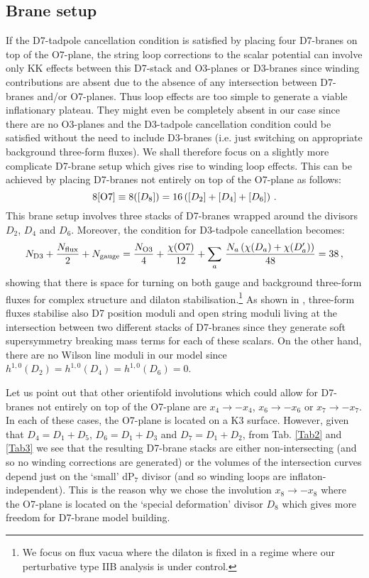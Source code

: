 \documentclass[11pt,a4paper]{article}
\newcommand{\be}{\begin{equation}}
\newcommand{\ee}{\end{equation}}
\def\nn{\nonumber}
\begin{document}
\subsection{Brane setup}

If the D7-tadpole cancellation condition is satisfied by placing four D7-branes on top of the O7-plane, the string loop corrections to the scalar potential can involve only KK effects between this D7-stack and O3-planes or D3-branes since winding contributions are absent due to the absence of any intersection between D7-branes and/or O7-planes. Thus loop effects are too simple to generate a viable inflationary plateau. They might even be completely absent in our case since there are no O3-planes and the D3-tadpole cancellation condition could be satisfied without the need to include D3-branes (i.e. just switching on appropriate background three-form fluxes). We shall therefore focus on a slightly more complicate D7-brane setup which gives rise to winding loop effects. This can be achieved by placing D7-branes not entirely on top of the O7-plane as follows:  
\be
8[{\rm O7}] \equiv 8([D_8]) = 16 \left([D_2]+[D_4]+[D_6] \right)\,.
\ee
This brane setup involves three stacks of D7-branes wrapped around the divisors $D_2$, $D_4$ and $D_6$. Moreover, the condition for D3-tadpole cancellation becomes:
\be
N_{\rm D3} + \frac{N_{\rm flux}}{2} + N_{\rm gauge} = \frac{N_{\rm O3}}{4} + \frac{\chi({\rm O7})}{12} + \sum_a\, \frac{N_a \left(\chi(D_a) + \chi(D_a^\prime) \right) }{48}  = 38 \,, \nn
\ee
showing that there is space for turning on both gauge and background three-form fluxes for complex structure and dilaton stabilisation.\footnote{We focus on flux vacua where the dilaton is fixed in a regime where our perturbative type IIB analysis is under control.} As shown in \cite{Camara:2004jj}, three-form fluxes stabilise also D7 position moduli and open string moduli living at the intersection between two different stacks of D7-branes since they generate soft supersymmetry breaking mass terms for each of these scalars. On the other hand, there are no Wilson line moduli in our model since $h^{1,0}(D_2)=h^{1,0}(D_4) = h^{1,0}(D_6)=0$. 

Let us point out that other orientifold involutions which could allow for D7-branes not entirely on top of the O7-plane are $x_4 \to - x_4$, $x_6 \to - x_6$ or $x_7 \to - x_7$. In each of these cases, the O7-plane is located on a K3 surface. However, given that $D_4 = D_1 + D_5$, $D_6 = D_1 + D_3$ and $D_7 = D_1 +D_2$, from Tab. \ref{Tab2} and \ref{Tab3} we see that the resulting D7-brane stacks are either non-intersecting (and so no winding corrections are generated) or the volumes of the intersection curves depend just on the `small' dP$_7$ divisor (and so winding loops are inflaton-independent). This is the reason why we chose the involution $x_8 \to - x_8$ where the O7-plane is located on the `special deformation' divisor $D_8$ which gives more freedom for D7-brane model building. 
\end{document}
